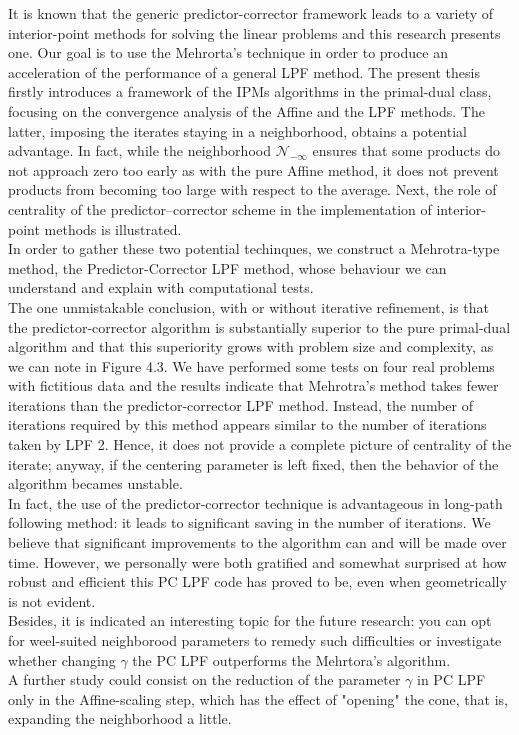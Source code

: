 \documentclass[a4paper,10 pt,titlepage,twoside]{book}
\theoremstyle{plain}
\theoremstyle{definition}
\theoremstyle{remark}
\begin{document}
{{It is known that the generic predictor-corrector framework leads to a variety of interior-point methods for solving the linear problems and this research presents one. Our goal is to use the Mehrorta's technique in order to produce an acceleration of the performance of a general LPF method. The present thesis firstly introduces a framework of the IPMs algorithms in
the primal-dual class, focusing on the convergence analysis of the Affine and the LPF methods. The latter, imposing the iterates staying in a neighborhood,  obtains a potential advantage. In fact, while the neighborhood $\mathcal{N}_{-\infty}$ ensures that some products do not approach zero too early as with the pure Affine method, it does not prevent products from becoming too large with respect to the average. Next, the role of centrality of the predictor–corrector scheme in the implementation of interior-point methods is illustrated.\\
In order to gather these two potential techinques, we construct a Mehrotra-type method, the Predictor-Corrector LPF method, whose
behaviour we can understand and explain with computational tests.\\
The one unmistakable conclusion, with or without iterative refinement, is that the predictor-corrector algorithm is substantially superior to the pure primal-dual algorithm and
that this superiority grows with problem size and complexity, as we can note in Figure 4.3. We have performed some tests on four real
problems with fictitious data and the results indicate that Mehrotra's method takes
fewer iterations than the predictor-corrector LPF
method. Instead, the number of iterations required by this method appears similar to the
number of iterations taken by LPF 2.
Hence, it does not provide a complete picture of centrality of the iterate; anyway, if the centering parameter is left fixed, then the behavior of the
algorithm becames unstable.\\
In fact, the use of the predictor-corrector technique is advantageous in long-path following method: it leads to significant saving in the number of iterations. We believe that significant improvements to the algorithm can and will be made over time.
However, we personally were both gratified and somewhat surprised at how robust and
efficient this PC LPF code has proved to be, even when geometrically is not evident. \\
Besides, it is indicated an interesting
topic for the future research: you can opt for weel-suited neighborood parameters to remedy such difficulties or investigate whether changing $\gamma$ the PC LPF outperforms the Mehrtora's algorithm.\\
A further study could consist on the reduction of the parameter $\gamma$ in PC LPF only in the Affine-scaling step, which has the effect of "opening" the cone, that is, expanding the neighborhood a little. 
\appendix
}}
\end{document}
